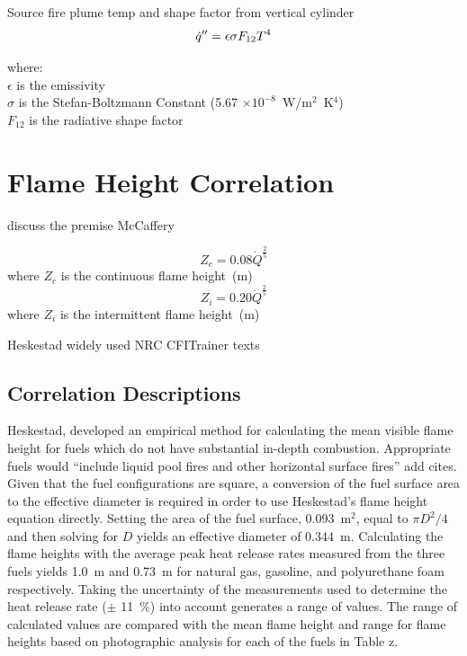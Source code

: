\documentclass[twoside]{uocthesis}
\begin{document}
Source fire plume temp and shape factor from vertical cylinder
\begin{equation}\label{eq:source_fire}
\dot{q}'' = \epsilon \sigma F_{12} T^4  \\
\end{equation}

\begin{tabbing}
where: \=  \\
\> $\epsilon$ is the emissivity  \\
\> $\sigma$ is the Stefan-Boltzmann Constant (5.67 $\times 10^{−8}$~W/m$^2$~K$^4$)  \\
\> $F_{12}$ is the radiative shape factor \\
\end{tabbing}

\section{Flame Height Correlation}

discuss the premise
McCaffery

\begin{equation}\label{eq:z_c}
Z_c = 0.08 \dot{Q}^{\frac{2}{5}}
\end{equation}
where $Z_c$ is the continuous flame height~(m)
\begin{equation}\label{eq:z_i}
Z_i = 0.20 \dot{Q}^{\frac{2}{5}}
\end{equation}
where $Z_i$ is the intermittent flame height~(m)

Heskestad widely used  NRC CFITrainer  texts



\subsection{Correlation Descriptions}
Heskestad, developed an empirical method for calculating the mean visible flame height for fuels which do not have substantial in-depth combustion.  Appropriate fuels would ``include liquid pool fires and other horizontal surface fires'' add cites.  Given that the fuel configurations are square, a conversion of the fuel surface area to the effective diameter is required in order to use Heskestad's flame height equation directly.  Setting the area of the fuel surface, 0.093~m$^2$, equal to $\pi D^2/4$ and then solving for $D$ yields an effective diameter of 0.344~m.
Calculating the flame heights with the average peak heat release rates measured from the three fuels yields 1.0~m and 0.73~m for natural gas, gasoline, and polyurethane foam respectively. Taking the uncertainty of the measurements used to determine the heat release rate ($\pm$ 11~\%) into account generates a range of values.   The range of calculated values are compared with the  mean flame height and range for flame heights  based on photographic analysis for each of the fuels in Table z.
\end{document}
